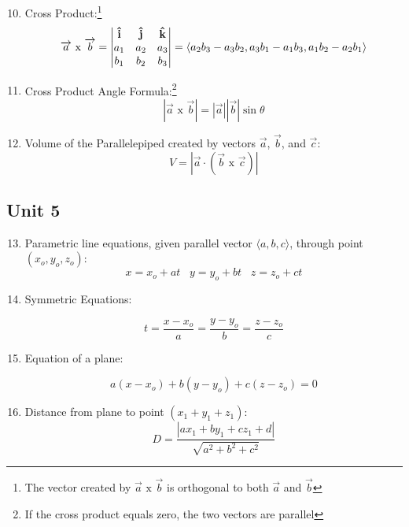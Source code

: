 \documentclass[12pt]{article}
\begin{document}
\begin{enumerate}
    \setcounter{enumi}{9}

  \item Cross Product:\footnote{The vector created by $\overrightarrow{a}\text{ x }\overrightarrow{b}$ is orthogonal to both $\overrightarrow{a}$ and $\overrightarrow{b}$}
    $$\overrightarrow{a}\text{ x }\overrightarrow{b}=\begin{vmatrix} \bold{\hat{i}} & \bold{\hat{j}} & \bold{\hat{k}}\\ a_1 & a_2 & a_3\\ b_1 & b_2 & b_3\\ \end{vmatrix}=\langle a_2b_3-a_3b_2, a_3b_1-a_1b_3,a_1b_2-a_2b_1\rangle$$

  \item Cross Product Angle Formula:\footnote{If the cross product equals zero, the two vectors are parallel}
    $$|\overrightarrow{a}\text{ x }\overrightarrow{b}|=|\overrightarrow{a}||\overrightarrow{b}|\sin\theta$$

  \item Volume of the Parallelepiped created by vectors $\overrightarrow{a}$, $\overrightarrow{b}$, and $\overrightarrow{c}$:
    $$V=|\overrightarrow{a}\cdot(\overrightarrow{b}\text{ x }\overrightarrow{c})|$$

\end{enumerate}

\subsection{Unit 5}

\begin{enumerate}
    \setcounter{enumi}{12}

  \item Parametric line equations, given parallel vector $\langle a,b,c \rangle$, through point $(x_o,y_o,z_o)$:
    $$x=x_o+at\,\,\,\,\,y=y_o+bt\,\,\,\,\,z=z_o+ct$$

  \item Symmetric Equations:

    $$t=\frac{x-x_o}{a}=\frac{y-y_o}{b}=\frac{z-z_o}{c}$$

  \item Equation of a plane:

    $$a(x-x_o)+b(y-y_o)+c(z-z_o)=0$$

  \item Distance from plane to point $(x_1+y_1+z_1)$:
    $$D=\frac{|ax_1+by_1+cz_1+d|}{\sqrt{a^2+b^2+c^2}}$$
\end{enumerate}
\end{document}
